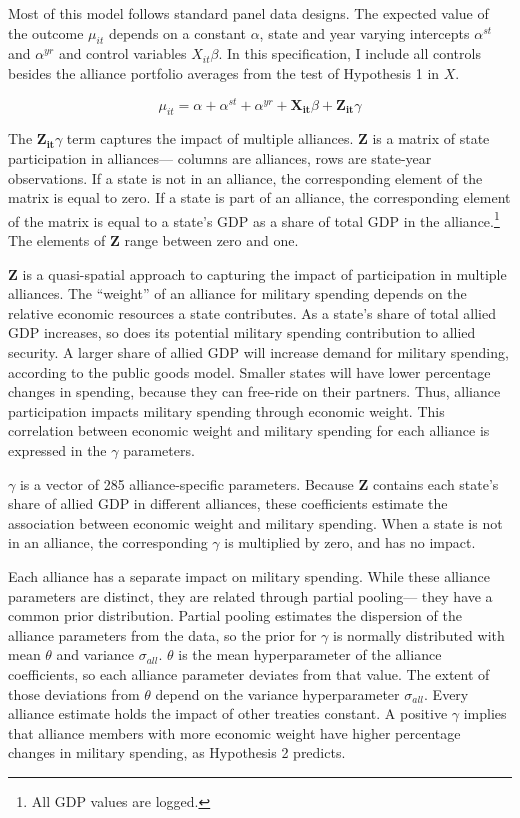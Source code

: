 \documentclass[12pt]{article}
\begin{document}
Most of this model follows standard panel data designs.
The expected value of the outcome $\mu_{it}$ depends on a constant $\alpha$, state and year varying intercepts $\alpha^{st}$ and $\alpha^{yr}$ and control variables $X_{it} \beta$. 
In this specification, I include all controls besides the alliance portfolio averages from the test of Hypothesis 1 in $X$.


\begin{equation}
\mu_{it} = \alpha + \alpha^{st} + \alpha^{yr} + \mathbf{X_{it}} \beta + \mathbf{Z_{it}} \gamma 
\end{equation}


The $\mathbf{Z_{it}} \gamma$ term captures the impact of multiple alliances. 
\textbf{Z} is a matrix of state participation in alliances--- columns are alliances, rows are state-year observations. 
If a state is not in an alliance, the corresponding element of the matrix is equal to zero. 
If a state is part of an alliance, the corresponding element of the matrix is equal to a state's GDP as a share of total GDP in the alliance.\footnote{All GDP values are logged.} 
The elements of \textbf{Z} range between zero and one. 


\textbf{Z} is a quasi-spatial approach to capturing the impact of participation in multiple alliances.
The ``weight'' of an alliance for military spending depends on the relative economic resources a state contributes.  
As a state's share of total allied GDP increases, so does its potential military spending contribution to allied security.  
A larger share of allied GDP will increase demand for military spending, according to the public goods model. 
Smaller states will have lower percentage changes in spending, because they can free-ride on their partners.
Thus, alliance participation impacts military spending through economic weight. 
This correlation between economic weight and military spending for each alliance is expressed in the $\gamma$ parameters. 


$\gamma$ is a vector of 285 alliance-specific parameters.  
Because \textbf{Z} contains each state's share of allied GDP in different alliances, these coefficients estimate the association between economic weight and military spending. 
When a state is not in an alliance, the corresponding $\gamma$ is multiplied by zero, and has no impact. 


Each alliance has a separate impact on military spending.
While these alliance parameters are distinct, they are related through partial pooling--- they have a common prior distribution.
Partial pooling estimates the dispersion of the alliance parameters from the data, so the prior for $\gamma$ is normally distributed with mean $\theta$ and variance $\sigma_{all}$. 
$\theta$ is the mean hyperparameter of the alliance coefficients, so each alliance parameter deviates from that value.
The extent of those deviations from $\theta$ depend on the variance hyperparameter $\sigma_{all}$.
Every alliance estimate holds the impact of other treaties constant. 
A positive $\gamma$ implies that alliance members with more economic weight have higher percentage changes in military spending, as Hypothesis 2 predicts. 
    
\end{document}
